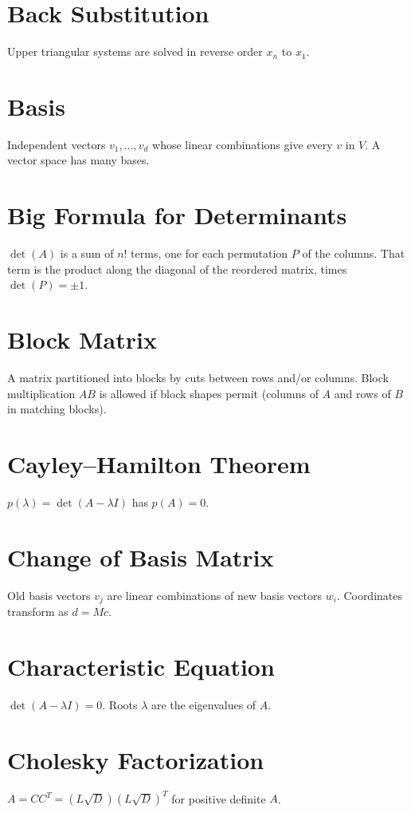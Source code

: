 \documentclass[12pt]{book}
\begin{document}
\chapter{Back Substitution}
Upper triangular systems are solved in reverse order $x_n$ to $x_1$.

\chapter{Basis}
Independent vectors $v_1,\dots,v_d$ whose linear combinations give every $v$ in $V$. A vector space has many bases.

\chapter{Big Formula for Determinants}
$\det(A)$ is a sum of $n!$ terms, one for each permutation $P$ of the columns. That term is the product along the diagonal of the reordered matrix, times $\det(P) = \pm 1$.

\chapter{Block Matrix}
A matrix partitioned into blocks by cuts between rows and/or columns. Block multiplication $AB$ is allowed if block shapes permit (columns of $A$ and rows of $B$ in matching blocks).

\chapter{Cayley--Hamilton Theorem}
$p(\lambda) = \det(A - \lambda I)$ has $p(A) = 0$.

\chapter{Change of Basis Matrix}
Old basis vectors $v_j$ are linear combinations of new basis vectors $w_i$. Coordinates transform as $d = M c$.

\chapter{Characteristic Equation}
$\det(A - \lambda I) = 0$. Roots $\lambda$ are the eigenvalues of $A$.

\chapter{Cholesky Factorization}
$A = C C^T = (L \sqrt{D})(L \sqrt{D})^T$ for positive definite $A$.
\end{document}
